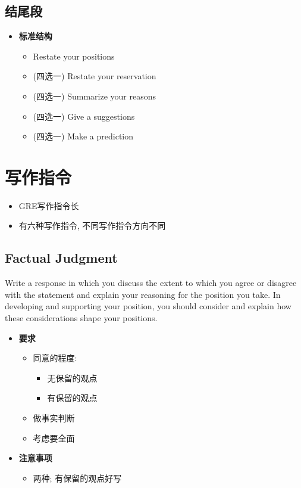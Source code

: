  \subsection{结尾段}

    \begin{itemize}
      \item \textbf{标准结构}
      \begin{itemize}
        \item Restate your positions
        \item (四选一) Restate your reservation
        \item (四选一) Summarize your reasons
        \item (四选一) Give a suggestions
        \item (四选一) Make a prediction
      \end{itemize}
    \end{itemize}

\section{写作指令}

  \begin{itemize}
    \item GRE写作指令长
    \item 有六种写作指令, 不同写作指令方向不同
  \end{itemize}

  \subsection{Factual Judgment}

    Write a response in which you discuss the extent to which you agree or
    disagree with the statement and explain your reasoning for the position you
    take. In developing and supporting your position, you should consider
     and
    explain how these considerations shape your positions.

    \begin{itemize}
      \item \textbf{要求}
      \begin{itemize}
        \item 同意的程度:
        \begin{itemize}
          \item 无保留的观点
          \item 有保留的观点
        \end{itemize}

        \item 做事实判断
        \item 考虑要全面
      \end{itemize}

      \item \textbf{注意事项}
      \begin{itemize}
        \item 两种; 有保留的观点好写
      \end{itemize}
    \end{itemize}

